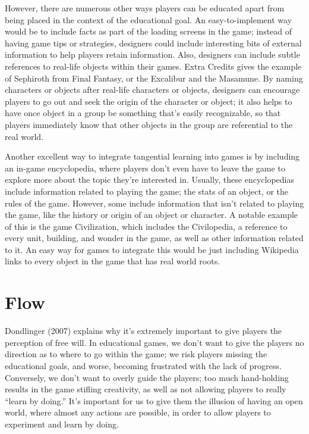 \documentclass[12pt]{report}
\begin{document}
		However, there are numerous other ways players can be educated apart from being placed in the context of the educational goal. An easy-to-implement way would be to include facts as part of the loading screens in the game; instead of having game tips or strategies, designers could include interesting bits of external information to help players retain information. Also, designers can include subtle references to real-life objects within their games. Extra Credits gives the example of Sephiroth from Final Fantasy, or the Excalibur and the Masamune. By naming characters or objects after real-life characters or objects, designers can encourage players to go out and seek the origin of the character or object; it also helps to have once object in a group be something that's easily recognizable, so that players immediately know that other objects in the group are referential to the real world.
		
		Another excellent way to integrate tangential learning into games is by including an in-game encyclopedia, where players don't even have to leave the game to explore more about the topic they're interested in. Usually, these encyclopedias include information related to playing the game; the stats of an object, or the rules of the game. However, some include information that isn't related to playing the game, like the history or origin of an object or character. A notable example of this is the game Civilization, which includes the Civilopedia, a reference to every unit, building, and wonder in the game, as well as other information related to it. An easy way for games to integrate this would be just including Wikipedia links to every object in the game that has real world roots.
	
	\section{Flow}

		Dondlinger (2007) explains why it's extremely important to give players the perception of free will. In educational games, we don't want to give the players no direction as to where to go within the game; we risk players missing the educational goals, and worse, becoming frustrated with the lack of progress. Conversely, we don't want to overly guide the players; too much hand-holding results in the game stifling creativity, as well as not allowing players to really “learn by doing.” It's important for us to give them the illusion of having an open world, where almost any actions are possible, in order to allow players to experiment and learn by doing.
\end{document}
